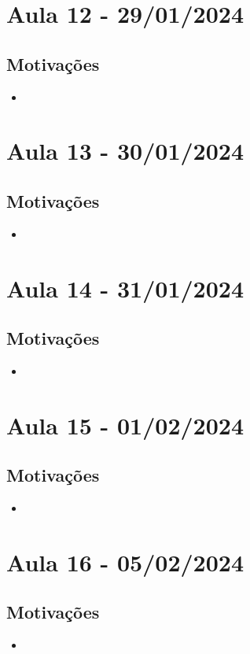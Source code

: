 \documentclass{article}
\begin{document}
\section{Aula 12 - 29/01/2024}
\subsection{Motivações}
\begin{itemize}
	\item
\end{itemize}
\newpage
\section{Aula 13 - 30/01/2024}
\subsection{Motivações}
\begin{itemize}
	\item
\end{itemize}
\newpage
\section{Aula 14 - 31/01/2024}
\subsection{Motivações}
\begin{itemize}
	\item
\end{itemize}
\newpage
\section{Aula 15 - 01/02/2024}
\subsection{Motivações}
\begin{itemize}
	\item
\end{itemize}
\newpage
\section{Aula 16 - 05/02/2024}
\subsection{Motivações}
\begin{itemize}
	\item
\end{itemize}
\newpage
\end{document}
